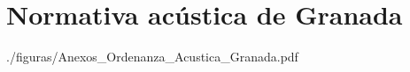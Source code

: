 \chapter{Normativa acústica de Granada} \label{append:normativa}


{./figuras/Anexos_Ordenanza_Acustica_Granada.pdf}

